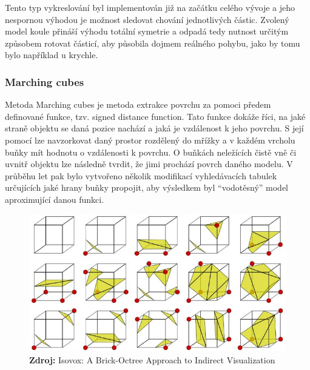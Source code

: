 Tento typ vykreslování byl implementován již na začátku celého vývoje a jeho nespornou výhodou je možnost sledovat chování jednotlivých částic. Zvolený model koule přináší výhodu totální symetrie a odpadá tedy nutnost určitým způsobem rotovat částicí, aby působila dojmem reálného pohybu, jako by tomu bylo například u krychle.

\subsubsection{Marching cubes}
Metoda Marching cubes \cite{marchingCubes} je metoda extrakce povrchu za pomoci předem definované funkce, tzv. signed distance function. Tato funkce dokáže říci, na jaké straně objektu se daná pozice nachází a jaká je vzdálenost k jeho povrchu. S její pomocí lze navzorkovat daný prostor rozdělený do mřížky a v každém vrcholu buňky mít hodnotu o vzdálenosti k povrchu. O buňkách neležících čistě vně či uvnitř objektu lze následně tvrdit, že jimi prochází povrch daného modelu. V průběhu let pak bylo vytvořeno několik modifikací vyhledávacích tabulek určujících jaké hrany buňky propojit, aby výsledkem byl \enquote{vodotěsný} model aproximující danou funkci.

\begin{figure}[hbt]
	\centering
	\captionsetup{justification=centering}
	\includegraphics[scale=0.5]{obrazky-figures/Look-up-table-for-the-Marching-Cubes-algorithm-13_W640.jpg}
	\textbf{Zdroj: } Isovox: A Brick-Octree Approach to Indirect Visualization \cite{isovox}
	\label{fig:EvapFlow}
\end{figure}

